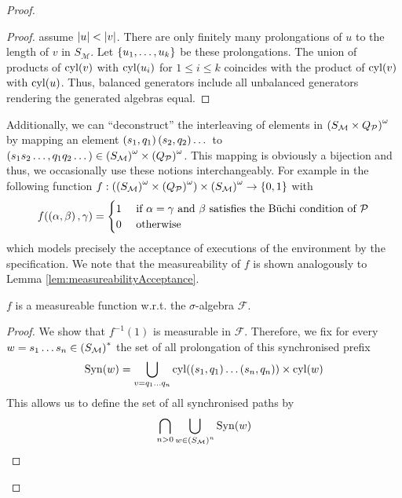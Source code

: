 \begin{proof}
\begin{proof}
  assume $\left\vert{u}\right\vert<\left\vert{v}\right\vert$. There are only finitely many prolongations of $u$
  to the length of $v$ in $S_{\mathcal{M}}$. Let $\left\{u_{1},\dots,u_{k}\right\}$ be
  these prolongations. The union of products of $\operatorname{cyl}(v)$ with $\operatorname{cyl}(u_{i})$
  for $1\leq i\leq k$ coincides with the product of $\operatorname{cyl}(v)$ with $\operatorname{cyl}(u)$.
  Thus, balanced generators include all unbalanced generators rendering the
  generated algebras equal.
\end{proof}
Additionally, we can \enquote{deconstruct} the interleaving of elements in
$\left(S_{\mathcal{M}}\times Q_{\mathcal{P}}\right)^{\omega}$ by mapping an element
$\left(s_{1},q_{1}\right)\left(s_{2},q_{2}\right)\dots$ to
$\left(s_{1}s_{2}\dots,q_{1}q_{2}\dots\right)\in
\left(S_{\mathcal{M}}\right)^{\omega}\times\left(Q_{\mathcal{P}}\right)^{\omega}$. This
mapping is obviously a bijection and thus, we occasionally use these notions
interchangeably. For example in the following function
$f:\left(\left(S_{\mathcal{M}}\right)^{\omega}\times
\left(Q_{\mathcal{P}}\right)^{\omega}\right)\times\left(S_{\mathcal{M}}\right)^{\omega}
\rightarrow\left\{0,1\right\}$ with
\begin{equation*}
  f(\left(\alpha,\beta\right),\gamma) =
  \begin{cases}
    1&\text{ if }\alpha = \gamma\text{ and }\beta
    \text{ satisfies the Büchi condition of }\mathcal{P}\\
    0&\text{ otherwise}
  \end{cases}
\end{equation*}
which models precisely the acceptance of executions of the environment by the
specification. We note that the measureability of $f$ is shown analogously to
Lemma \ref{lem:measureabilityAcceptance}.
\begin{lemma}
  $f$ is a measureable function w.r.t. the $\sigma$-algebra $\mathcal{F}$.
\end{lemma}
\begin{proof}
  We show that $f^{-1}(1)$ is measurable in $\mathcal{F}$. Therefore, we fix
  for every $w = s_{1}\dots s_{n}\in \left(S_{\mathcal{M}}\right)^{*}$ the set of
  all prolongation of this synchronised prefix
  \begin{equation*}
    \operatorname{Syn}(w) = \bigcup_{v = q_{1}\dots q_{n}}\operatorname{cyl}(\left(s_{1},q_{1}\right)\dots
    \left(s_{n},q_{n}\right))\times\operatorname{cyl}(w)
  \end{equation*}
  This allows us to define the set of all synchronised paths by
  \begin{equation*}
    \bigcap_{n>0}\bigcup_{w\in \left(S_{\mathcal{M}}\right)^{n}}\operatorname{Syn}(w)
  \end{equation*}

\end{proof}
\end{proof}
